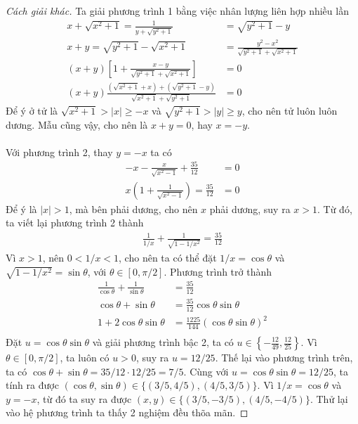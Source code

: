 \documentclass{treatise}
\begin{document}
\begin{proof}[Cách giải khác]
Ta giải phương trình 1 bằng việc nhân lượng liên hợp nhiều lần
\begin{align*}
x + \sqrt{x^2 + 1} = \frac{1}{y + \sqrt{y^2 + 1}} & = \sqrt{y^2 + 1} - y \\
x + y = \sqrt{y^2 + 1} - \sqrt{x^2 + 1} & = \frac{y^2 - x^2}{\sqrt{y^2 + 1} + \sqrt{x^2 + 1}} \\
(x + y) \left[ 1 + \frac{x - y}{\sqrt{y^2 + 1} + \sqrt{x^2 + 1}} \right] & = 0 \\
(x + y) \frac{\left( \sqrt{x^2 + 1} + x \right) + \left( \sqrt{y^2 + 1} - y \right)}{\sqrt{x^2 + 1} + \sqrt{y^2 + 1}} & = 0
\end{align*}
Để ý ở tử là $\sqrt{x^2 + 1} > |x| \geq -x$ và $\sqrt{y^2 + 1} > |y| \geq y$, cho nên tử luôn luôn dương. Mẫu cũng vậy, cho nên là $x + y = 0$, hay $x = -y$.
\\
\\
Với phương trình 2, thay $y = -x$ ta có
\begin{align*}
- x - \frac{x}{\sqrt{x^2 - 1}} + \frac{35}{12} & = 0 \\
x \left( 1 + \frac{1}{\sqrt{x^2 - 1}} \right) = \frac{35}{12} & = 0
\end{align*}
Để ý là $|x| > 1$, mà bên phải dương, cho nên $x$ phải dương, suy ra $x > 1$. Từ đó, ta viết lại phương trình 2 thành
\begin{align*}
\frac{1}{1/x} + \frac{1}{\sqrt{1 - 1/x^2}} = \frac{35}{12}
\end{align*}
Vì $x > 1$, nên $0 < 1/x < 1$, cho nên ta có thể đặt $1/x = \cos \theta$ và $\sqrt{1-1/x^2} = \sin \theta$, với $\theta \in [0, \pi/2]$. Phương trình trở thành
\begin{align*}
\frac{1}{\cos \theta} + \frac{1}{\sin \theta} & = \frac{35}{12} \\
\cos \theta + \sin \theta & = \frac{35}{12} \cos \theta \sin \theta \\
1 + 2 \cos \theta \sin \theta & = \frac{1225}{144} (\cos \theta \sin \theta)^2 \\
\end{align*}
Đặt $u = \cos \theta \sin \theta$ và giải phương trình bậc 2, ta có $u \in \left\{ -\frac{12}{49}, \frac{12}{25} \right\}$. Vì $\theta \in [0, \pi/2]$, ta luôn có $u > 0$, suy ra $u = 12/25$. Thế lại vào phương trình trên, ta có $\cos \theta + \sin \theta = 35/12 \cdot 12/25 = 7/5$. Cùng với $u = \cos \theta \sin \theta = 12/25$, ta tính ra được $(\cos \theta, \sin \theta) \in \{ (3/5, 4/5), (4/5, 3/5) \}$. Vì $1/x = \cos \theta$ và $y = -x$, từ đó ta suy ra được $(x, y) \in \{ (3/5, -3/5), (4/5, -4/5) \}$. Thử lại vào hệ phương trình ta thấy 2 nghiệm đều thõa mãn.
\end{proof}
\end{document}
